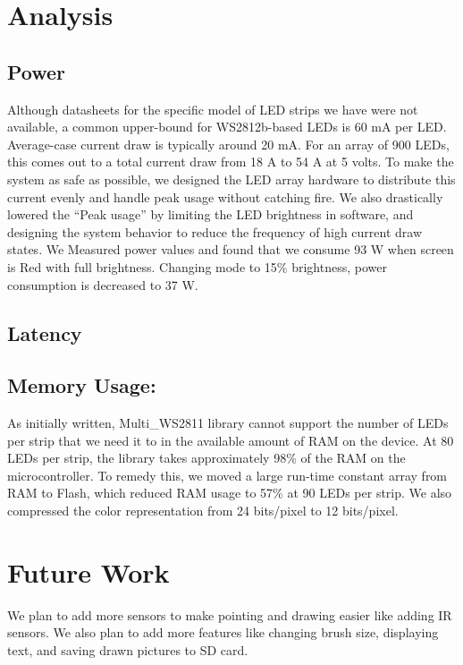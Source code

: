 \documentclass{tufte-handout}
\begin{document}
\section{\textbf{Analysis}}
\subsection{Power}
Although datasheets for the specific model of LED strips we have were not
available, a common upper-bound for WS2812b-based 
LEDs is 60 mA per LED. Average-case current draw is typically around
    20 mA. For an array of 900 LEDs, this comes out to a total current draw
    from 18 A to 54 A at 5 volts. To make the system as safe as possible, we designed the
    LED array hardware to distribute this current evenly and
    handle peak usage without catching fire. We also drastically lowered the ``Peak usage'' by limiting the LED brightness in software, and designing the
    system behavior to reduce the frequency of high current draw
    states.
    We Measured power values and found that we consume 93 W when screen is Red with full brightness. Changing mode to 15\% brightness, power consumption is decreased to 37 W.
\subsection{Latency}

\subsection{Memory Usage:}
As initially written, Multi\_WS2811 library cannot support the number of LEDs per strip that we need it to in the available amount of RAM on the device. At 80 LEDs per strip, the library takes approximately 98\% of the RAM on the microcontroller. To remedy this, we moved a large run-time constant array from RAM to Flash, which reduced RAM usage to 57\% at 90 LEDs per strip. We also compressed the color representation from 24 bits/pixel to 12 bits/pixel.

\section{Future Work}
We plan to add more sensors to make pointing and drawing easier like adding IR sensors. We also plan to add more features like changing brush size, displaying text, and saving drawn pictures to SD card.
\end{document}
